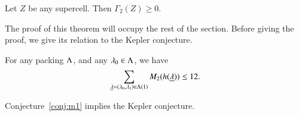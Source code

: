 \begin{theorem}\label{lemma:superineq} 
Let $Z$ be any supercell.  Then $\Gamma_2(Z)\ge 0$.
\end{theorem}

The proof of this theorem will occupy the rest of the section.  Before giving the proof, we give its relation to the Kepler conjecture.


\begin{conjecture}\label{conj:m2} For any packing $\Lambda$, and
any $\lambda_0\in\Lambda$, we have
\begin{equation}\label{eqn:M12}
\sum_{{\underline{\lambda}}=(\lambda_0,\lambda_1)\in\Lambda(1)} M_2(h({\underline{\lambda}})) \le 12.
\end{equation}
\end{conjecture}

\begin{theorem}\label{theorem:mk2}
Conjecture~\ref{conj:m1} implies the Kepler conjecture.
\end{theorem}

